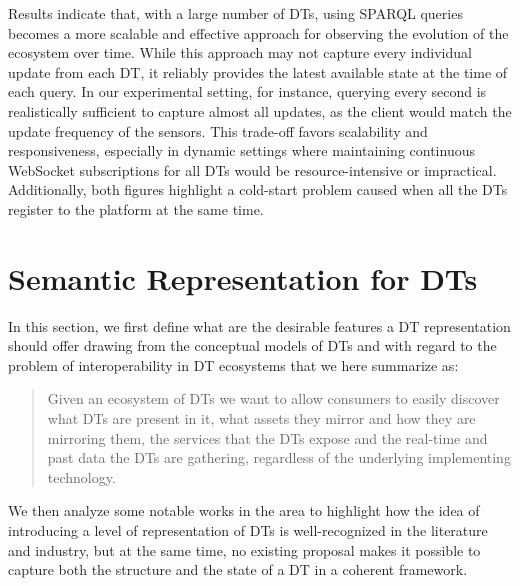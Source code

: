 Results indicate that, with a large number of \acp{DT}, using SPARQL queries becomes a more scalable and effective approach for observing the evolution of the ecosystem over time.
%
While this approach may not capture every individual update from each \ac{DT}, it reliably provides the latest available state at the time of each query.
In our experimental setting, for instance, querying every second is realistically sufficient to capture almost all updates, as the client would match the update frequency of the sensors.
This trade-off favors scalability and responsiveness, especially in dynamic settings where maintaining continuous WebSocket subscriptions for all \acp{DT} would be resource-intensive or impractical.
%
Additionally, both figures highlight a cold-start problem caused when all the \acp{DT} register to the platform at the same time. 



\section{Semantic Representation for \aclp{DT}}



In this section, we first define what are the desirable features a DT representation should offer drawing from the conceptual models of DTs and with regard to the problem of interoperability in DT ecosystems that we here summarize as:
\begin{quote}
    Given an ecosystem of DTs we want to allow consumers to easily discover what DTs are present in it, what assets they mirror and how they are mirroring them, the services that the DTs expose and the real-time and past data the DTs are gathering, regardless of the underlying implementing technology.
\end{quote}
We then analyze some notable works in the area to highlight how the idea of introducing a level of representation of DTs is well-recognized in the literature and industry, but at the same time, no existing proposal makes it possible to capture both the structure and the state of a DT in a coherent framework.

